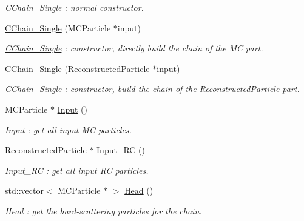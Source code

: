 \begin{DoxyCompactItemize}
\begin{DoxyCompactList}\small\item\em \hyperlink{classToolSet_1_1CChain__Single}{CChain\_\-Single} : normal constructor. \item\end{DoxyCompactList}\item 
\hyperlink{classToolSet_1_1CChain__Single_a8e1e1a544c3fb42165a90e265205c614}{CChain\_\-Single} (MCParticle $\ast$input)
\begin{DoxyCompactList}\small\item\em \hyperlink{classToolSet_1_1CChain__Single}{CChain\_\-Single} : constructor, directly build the chain of the MC part. \item\end{DoxyCompactList}\item 
\hyperlink{classToolSet_1_1CChain__Single_a2d0b72a468147b80466db9d5e61d6e70}{CChain\_\-Single} (ReconstructedParticle $\ast$input)
\begin{DoxyCompactList}\small\item\em \hyperlink{classToolSet_1_1CChain__Single}{CChain\_\-Single} : constructor, build the chain of the ReconstructedParticle part. \item\end{DoxyCompactList}\item 
MCParticle $\ast$ \hyperlink{classToolSet_1_1CChain__Single_a083e8042cf9d2ede88f69037a318cbae}{Input} ()
\begin{DoxyCompactList}\small\item\em Input : get all input MC particles. \item\end{DoxyCompactList}\item 
ReconstructedParticle $\ast$ \hyperlink{classToolSet_1_1CChain__Single_a9c9c897ea89b3d8adf3b71d119a66324}{Input\_\-RC} ()
\begin{DoxyCompactList}\small\item\em Input\_\-RC : get all input RC particles. \item\end{DoxyCompactList}\item 
std::vector$<$ MCParticle $\ast$ $>$ \hyperlink{classToolSet_1_1CChain__Single_a583818358adab4a442ebe74a1ed7d5fd}{Head} ()
\begin{DoxyCompactList}\small\item\em Head : get the hard-\/scattering particles for the chain. \item\end{DoxyCompactList}\item 

\end{DoxyCompactItemize}
